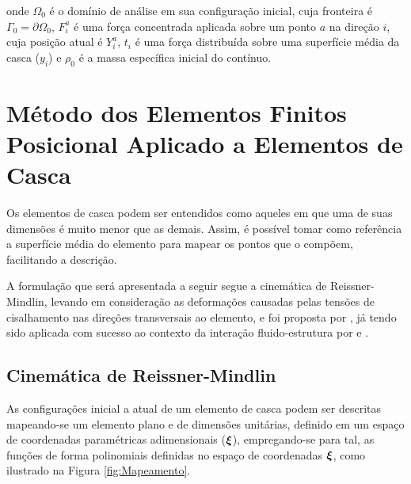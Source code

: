\noindent onde $\Omega_0$ é o domínio de análise em sua configuração inicial, cuja fronteira é $\Gamma_0=\partial\Omega_0$, $F_i^a$ é uma força concentrada aplicada sobre um ponto $a$ na direção $i$, cuja posição atual é $Y_i^a$, $t_i$ é uma força distribuída sobre uma superfície média da casca ($y_i$) e $\rho_0$ é a massa específica inicial do contínuo.


\section{Método dos Elementos Finitos Posicional Aplicado a Elementos de Casca} \label{MEFP}

Os elementos de casca podem ser entendidos como aqueles em que uma de suas dimensões é muito menor que as demais. Assim, é possível tomar como referência a superfície média do elemento para mapear os pontos que o compõem, facilitando a descrição.

A formulação que será apresentada a seguir segue a cinemática de Reissner-Mindlin, levando em consideração as deformações causadas pelas tensões de cisalhamento nas direções transversais ao elemento, e foi proposta por , já tendo sido aplicada com sucesso ao contexto da interação fluido-estrutura por  e .

\subsection{Cinemática de Reissner-Mindlin}

As configurações inicial a atual de um elemento de casca podem ser descritas mapeando-se um elemento plano e de dimensões unitárias, definido em um espaço de coordenadas paramétricas adimensionais ($\boldsymbol{\xi}$), empregando-se para tal, as funções de forma polinomiais definidas no espaço de coordenadas $\boldsymbol{\xi}$, como ilustrado na Figura \ref{fig:Mapeamento}.

